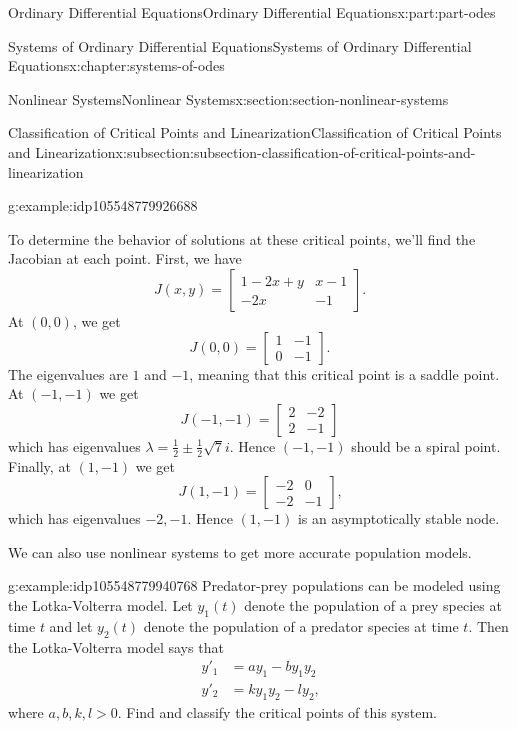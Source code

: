 \documentclass[oneside,10pt,]{book}
\numberwithin{equation}{part}
\newcommand{\amp}{&}
\begin{document}
\begin{partptx}{Ordinary Differential Equations}{}{Ordinary Differential Equations}{}{}{x:part:part-odes}
\begin{chapterptx}{Systems of Ordinary Differential Equations}{}{Systems of Ordinary Differential Equations}{}{}{x:chapter:systems-of-odes}
\begin{sectionptx}{Nonlinear Systems}{}{Nonlinear Systems}{}{}{x:section:section-nonlinear-systems}
\begin{subsectionptx}{Classification of Critical Points and Linearization}{}{Classification of Critical Points and Linearization}{}{}{x:subsection:subsection-classification-of-critical-points-and-linearization}
\begin{example}{}{g:example:idp105548779926688}
\par
To determine the behavior of solutions at these critical points, we'll find the Jacobian at each point. First, we have%
\begin{equation*}
J(x,y) = \begin{bmatrix} 1 - 2x + y \amp x - 1 \\ -2x \amp -1\end{bmatrix}\text{.}
\end{equation*}
At \((0,0)\), we get%
\begin{equation*}
J(0,0) = \begin{bmatrix} 1 \amp -1 \\ 0 \amp -1\end{bmatrix}\text{.}
\end{equation*}
The eigenvalues are \(1\) and \(-1\), meaning that this critical point is a saddle point. At \((-1,-1)\) we get%
\begin{equation*}
J(-1,-1) = \begin{bmatrix}2 \amp -2 \\ 2 \amp -1\end{bmatrix}
\end{equation*}
which has eigenvalues \(\lambda = \frac{1}{2}\pm\frac{1}{2}\sqrt{7}i\). Hence \((-1,-1)\) should be a spiral point. Finally, at \((1,-1)\) we get%
\begin{equation*}
J(1,-1) = \begin{bmatrix} -2 \amp 0 \\ -2 \amp -1\end{bmatrix}\text{,}
\end{equation*}
which has eigenvalues \(-2,-1\). Hence \((1,-1)\) is an asymptotically stable node.%
\end{example}
%
We can also use nonlinear systems to get more accurate population models.%
\begin{example}{}{g:example:idp105548779940768}%
Predator-prey populations can be modeled using the Lotka-Volterra model. Let \(y_{1}(t)\) denote the population of a prey species at time \(t\) and let \(y_{2}(t)\) denote the population of a predator species at time \(t\). Then the Lotka-Volterra model says that%
\begin{align*}
y'_{1} \amp = ay_{1}-by_{1}y_{2}\\
y'_{2} \amp = ky_{1}y_{2} - ly_{2}\text{,}
\end{align*}
where \(a,b,k,l>0\). Find and classify the critical points of this system.%

\end{example}
\end{subsectionptx}
\end{sectionptx}
\end{chapterptx}
\end{partptx}
\end{document}
